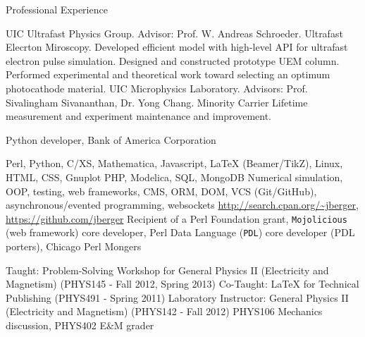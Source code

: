 \begin{rubric}{Professional Experience}


  \entry*[2005 --- 2013] UIC Ultrafast Physics Group. Advisor: Prof. W. Andreas Schroeder. Ultrafast Elecrton Miroscopy.
  \entry* Developed efficient model with high-level API for ultrafast electron pulse simulation. 
  \entry* Designed and constructed prototype UEM column.
  \entry* Performed experimental and theoretical work toward selecting an optimum photocathode material.
  \entry*[2003 --- 2005] UIC Microphysics Laboratory. Advisors: Prof. Sivalingham Sivananthan, Dr. Yong Chang.
  \entry* Minority Carrier Lifetime measurement and experiment maintenance and improvement.


   Python developer, Bank of America Corporation


  \entry*[Proficient in] Perl, Python, C/XS, Mathematica, Javascript, \LaTeX{} (Beamer/TikZ), Linux, HTML, CSS, Gnuplot
   PHP, Modelica, SQL, MongoDB
  \entry*[Concepts] Numerical simulation, OOP, testing, web frameworks, CMS, ORM, DOM, VCS (Git/GitHub), asynchronous/evented programming, websockets
  \entry*[Code] \url{http://search.cpan.org/~jberger}, \url{https://github.com/jberger}
  \entry*[Affiliations] Recipient of a Perl Foundation grant, \texttt{Mojolicious} (web framework) core developer, Perl Data Language (\texttt{PDL}) core developer (PDL porters), Chicago Perl Mongers
  

  \entry*[Teaching] Taught: Problem-Solving Workshop for General Physics II (Electricity and Magnetism) (PHYS145 - Fall 2012, Spring 2013) 
  \entry*[Teaching] Co-Taught: \LaTeX{} for Technical Publishing (PHYS491 - Spring 2011)
  \entry*[T.A.] Laboratory Instructor: General Physics II (Electricity and Magnetism) (PHYS142 - Fall 2012)
  \entry*[T.A.] PHYS106 Mechanics discussion, PHYS402 E\&M grader

\end{rubric}
